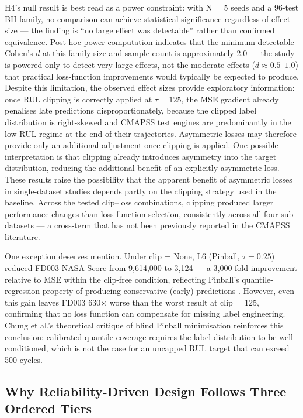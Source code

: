 \documentclass[review,12pt]{elsarticle}
\begin{document}
H4's null result is best read as a power constraint: with N = 5 seeds and a 96-test BH family, no comparison can achieve statistical significance regardless of effect size --- the finding is ``no large effect was detectable'' rather than confirmed equivalence. Post-hoc power computation indicates that the minimum detectable Cohen's $d$ at this family size and sample count is approximately 2.0 --- the study is powered only to detect very large effects, not the moderate effects ($d \approx 0.5$--$1.0$) that practical loss-function improvements would typically be expected to produce. Despite this limitation, the observed effect sizes provide exploratory information: once RUL clipping is correctly applied at $\tau = 125$, the MSE gradient already penalises late predictions disproportionately, because the clipped label distribution is right-skewed and CMAPSS test engines are predominantly in the low-RUL regime at the end of their trajectories. Asymmetric losses may therefore provide only an additional adjustment once clipping is applied. One possible interpretation is that clipping already introduces asymmetry into the target distribution, reducing the additional benefit of an explicitly asymmetric loss. These results raise the possibility that the apparent benefit of asymmetric losses in single-dataset studies \cite{ref37,ref38,ref39} depends partly on the clipping strategy used in the baseline. Across the tested clip--loss combinations, clipping produced larger performance changes than loss-function selection, consistently across all four sub-datasets --- a cross-term that has not been previously reported in the CMAPSS literature.

One exception deserves mention. Under clip = None, L6 (Pinball, $\tau = 0.25$) reduced FD003 NASA Score from 9,614,000 to 3,124 — a 3,000-fold improvement relative to MSE within the clip-free condition, reflecting Pinball's quantile-regression property of producing conservative (early) predictions \cite{ref40}. However, even this gain leaves FD003 630× worse than the worst result at clip = 125, confirming that no loss function can compensate for missing label engineering. Chung et al.'s \cite{ref41} theoretical critique of blind Pinball minimisation reinforces this conclusion: calibrated quantile coverage requires the label distribution to be well-conditioned, which is not the case for an uncapped RUL target that can exceed 500 cycles.

\subsection{Why Reliability-Driven Design Follows Three Ordered Tiers}
\end{document}
